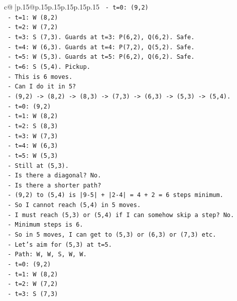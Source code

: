 \documentclass{article}
\begin{document}
{\begin{supertabular}{c@{$\;$}|p{.15\linewidth}@{}p{.15\linewidth}p{.15\linewidth}p{.15\linewidth}p{.15\linewidth}p{.15\linewidth}}
{{{\texttt{      {-} t=0: (9,2)} \\
\texttt{      {-} t=1: W (8,2)} \\
\texttt{      {-} t=2: W (7,2)} \\
\texttt{      {-} t=3: S (7,3). Guards at t=3: P(6,2), Q(6,2). Safe.} \\
\texttt{      {-} t=4: W (6,3). Guards at t=4: P(7,2), Q(5,2). Safe.} \\
\texttt{      {-} t=5: W (5,3). Guards at t=5: P(6,2), Q(6,2). Safe.} \\
\texttt{      {-} t=6: S (5,4). Pickup.} \\
\texttt{      {-} This is 6 moves.} \\
\texttt{      {-} Can I do it in 5?} \\
\texttt{      {-} (9,2) {-}> (8,2) {-}> (8,3) {-}> (7,3) {-}> (6,3) {-}> (5,3) {-}> (5,4).} \\
\texttt{      {-} t=0: (9,2)} \\
\texttt{      {-} t=1: W (8,2)} \\
\texttt{      {-} t=2: S (8,3)} \\
\texttt{      {-} t=3: W (7,3)} \\
\texttt{      {-} t=4: W (6,3)} \\
\texttt{      {-} t=5: W (5,3)} \\
\texttt{      {-} Still at (5,3).} \\
\texttt{      {-} Is there a diagonal? No.} \\
\texttt{      {-} Is there a shorter path?} \\
\texttt{      {-} (9,2) to (5,4) is |9{-}5| + |2{-}4| = 4 + 2 = 6 steps minimum.} \\
\texttt{      {-} So I cannot reach (5,4) in 5 moves.} \\
\texttt{      {-} I must reach (5,3) or (5,4) if I can somehow skip a step? No.} \\
\texttt{      {-} Minimum steps is 6.} \\
\texttt{      {-} So in 5 moves, I can get to (5,3) or (6,3) or (7,3) etc.} \\
\texttt{      {-} Let's aim for (5,3) at t=5.} \\
\texttt{      {-} Path: W, W, S, W, W.} \\
\texttt{      {-} t=0: (9,2)} \\
\texttt{      {-} t=1: W (8,2)} \\
\texttt{      {-} t=2: W (7,2)} \\
\texttt{      {-} t=3: S (7,3)} \\
}}}
\end{supertabular}}
\end{document}
